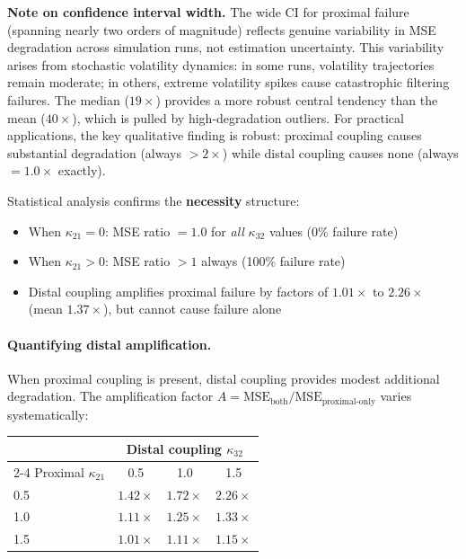 \documentclass[10pt]{article} %
\theoremstyle{plain}
\theoremstyle{definition}
\begin{document}
\noindent \textbf{Note on confidence interval width.} The wide CI for proximal failure (spanning nearly two orders of magnitude) reflects genuine variability in MSE degradation across simulation runs, not estimation uncertainty. This variability arises from stochastic volatility dynamics: in some runs, volatility trajectories remain moderate; in others, extreme volatility spikes cause catastrophic filtering failures. The median ($19\times$) provides a more robust central tendency than the mean ($40\times$), which is pulled by high-degradation outliers. For practical applications, the key qualitative finding is robust: proximal coupling causes substantial degradation (always $>2\times$) while distal coupling causes none (always $=1.0\times$ exactly).

\noindent Statistical analysis confirms the \textbf{necessity} structure:
\begin{itemize}
    \item When $\kappa_{21} = 0$: MSE ratio $= 1.0$ for \emph{all} $\kappa_{32}$ values (0\% failure rate)
    \item When $\kappa_{21} > 0$: MSE ratio $> 1$ always (100\% failure rate)
    \item Distal coupling amplifies proximal failure by factors of $1.01\times$ to $2.26\times$ (mean $1.37\times$), but cannot cause failure alone
\end{itemize}

\paragraph{Quantifying distal amplification.} When proximal coupling is present, distal coupling provides modest additional degradation. The amplification factor $A = \text{MSE}_{\text{both}} / \text{MSE}_{\text{proximal-only}}$ varies systematically:

\begin{center}
\begin{tabular}{lccc}
\toprule
& \multicolumn{3}{c}{Distal coupling $\kappa_{32}$} \\
\cmidrule(lr){2-4}
Proximal $\kappa_{21}$ & 0.5 & 1.0 & 1.5 \\
\midrule
0.5 & $1.42\times$ & $1.72\times$ & $2.26\times$ \\
1.0 & $1.11\times$ & $1.25\times$ & $1.33\times$ \\
1.5 & $1.01\times$ & $1.11\times$ & $1.15\times$ \\
\bottomrule
\end{tabular}
\end{center}
\end{document}
